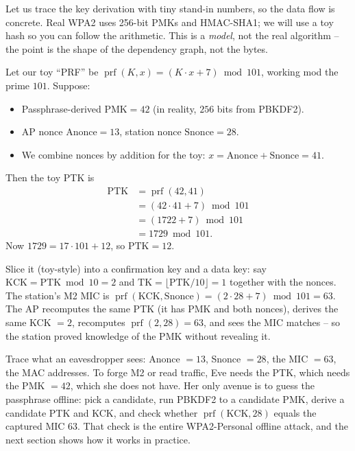 Let us trace the key derivation with tiny stand-in numbers, so the data flow is
concrete. Real WPA2 uses 256-bit PMKs and HMAC-SHA1; we will use a toy hash so
you can follow the arithmetic. This is a \emph{model}, not the real algorithm --
the point is the shape of the dependency graph, not the bytes.

\begin{example}
\label{ch26:toy-handshake}
Let our toy ``PRF'' be $\operatorname{prf}(K, x) = (K \cdot x + 7) \bmod 101$, working
mod the prime $101$. Suppose:
\begin{itemize}
  \item Passphrase-derived $\text{PMK} = 42$ (in reality, $256$ bits from PBKDF2).
  \item AP nonce $\text{Anonce} = 13$, station nonce $\text{Snonce} = 28$.
  \item We combine nonces by addition for the toy: $x = \text{Anonce} +
        \text{Snonce} = 41$.
\end{itemize}
Then the toy PTK is
\begin{align*}
  \text{PTK} &= \operatorname{prf}(42, 41) \\
             &= (42 \cdot 41 + 7) \bmod 101 \\
             &= (1722 + 7) \bmod 101 \\
             &= 1729 \bmod 101.
\end{align*}
Now $1729 = 17 \cdot 101 + 12$, so $\text{PTK} = 12$.

Slice it (toy-style) into a confirmation key and a data key: say
$\text{KCK} = \text{PTK} \bmod 10 = 2$ and $\text{TK} = \lfloor \text{PTK}/10
\rfloor = 1$ together with the nonces. The station's M2 MIC is
$\operatorname{prf}(\text{KCK}, \text{Snonce}) = (2 \cdot 28 + 7) \bmod 101 = 63$. The AP
recomputes the same PTK (it has PMK and both nonces), derives the same KCK $= 2$,
recomputes $\operatorname{prf}(2, 28) = 63$, and sees the MIC matches -- so the station
proved knowledge of the PMK without revealing it.
\end{example}

Trace what an eavesdropper sees: Anonce $= 13$, Snonce $= 28$, the MIC $= 63$, the
MAC addresses. To forge M2 or read traffic, Eve needs the PTK, which needs the
PMK $= 42$, which she does not have. Her only avenue is to guess the passphrase
offline: pick a candidate, run PBKDF2 to a candidate PMK, derive a candidate PTK
and KCK, and check whether $\operatorname{prf}(\text{KCK}, 28)$ equals the captured MIC
$63$. That check is the entire WPA2-Personal offline attack, and the next section
shows how it works in practice.

